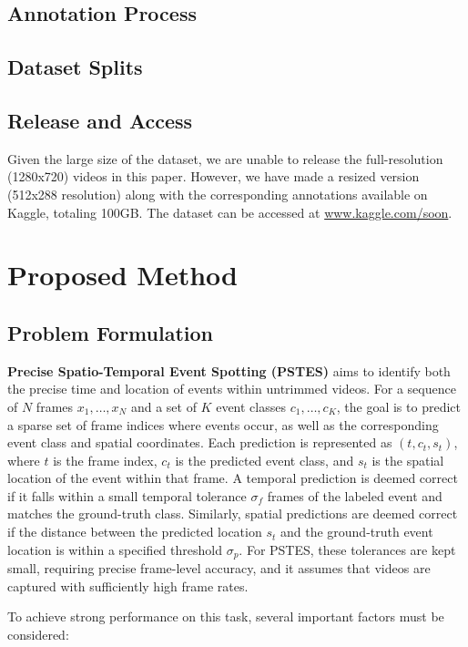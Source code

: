 \documentclass[conference]{IEEEtran}
\begin{document}
\subsection{Annotation Process}
\subsection{Dataset Splits}
\subsection{Release and Access}
Given the large size of the dataset, we are unable to release the full-resolution (1280x720) videos in this paper. However, we have made a resized version (512x288 resolution) along with the corresponding annotations available on Kaggle, totaling 100GB. The dataset can be accessed at \url{www.kaggle.com/soon}.


\section{Proposed Method}
\subsection{Problem Formulation}
\textbf{Precise Spatio-Temporal Event Spotting (PSTES)} aims to identify both the precise time and location of events within untrimmed videos. For a sequence of \(N\) frames \(x_1, \ldots, x_N\) and a set of \(K\) event classes \(c_1, \ldots, c_K\), the goal is to predict a sparse set of frame indices where events occur, as well as the corresponding event class and spatial coordinates. Each prediction is represented as \((t, c_t, s_t)\), where \(t\) is the frame index, \(c_t\) is the predicted event class, and \(s_t\) is the spatial location of the event within that frame. A temporal prediction is deemed correct if it falls within a small temporal tolerance \(\sigma_f\) frames of the labeled event and matches the ground-truth class. Similarly, spatial predictions are deemed correct if the distance between the predicted location \(s_t\) and the ground-truth event location is within a specified threshold \(\sigma_p\). For PSTES, these tolerances are kept small, requiring precise frame-level accuracy, and it assumes that videos are captured with sufficiently high frame rates.

To achieve strong performance on this task, several important factors must be considered:
\end{document}
